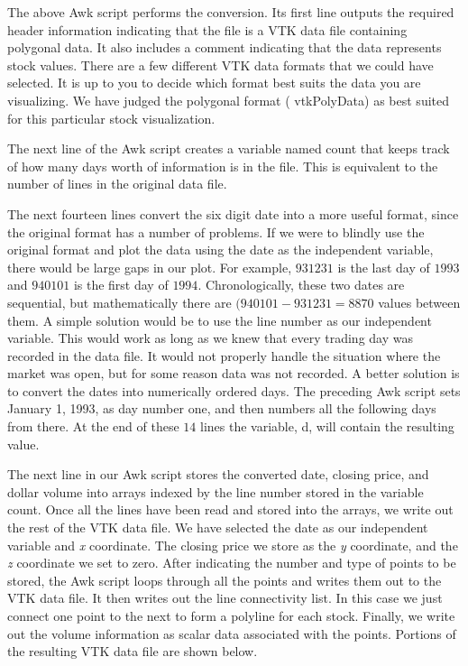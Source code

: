 \noindent The above Awk script performs the conversion. Its first line outputs the required header information indicating that the file is a VTK data file containing polygonal data. It also includes a comment indicating that the data represents stock values. There are a few different VTK data formats that we could have selected. It is up to you to decide which format best suits the data you are visualizing. We have judged the polygonal format ( vtkPolyData) as best suited for this particular stock visualization.

The next line of the Awk script creates a variable named count that keeps track of how many days worth of information is in the file. This is equivalent to the number of lines in the original data file.

The next fourteen lines convert the six digit date into a more useful format, since the original format has a number of problems. If we were to blindly use the original format and plot the data using the date as the independent variable, there would be large gaps in our plot. For example,  $931231$ is the last day of $1993$ and $940101$ is the first day of $1994$. Chronologically, these two dates are sequential, but mathematically there are $(940101 - 931231 = 8870$ values between them. A simple solution would be to use the line number as our independent variable. This would work as long as we knew that every trading day was recorded in the data file. It would not properly handle the situation where the market was open, but for some reason data was not recorded. A better solution is to convert the dates into numerically ordered days. The preceding Awk script sets January 1, 1993, as day number one, and then numbers all the following days from there. At the end of these $14$ lines the variable, d, will contain the resulting value.

The next line in our Awk script stores the converted date, closing price, and dollar volume  into arrays indexed by the line number stored in the variable count. Once all the lines have been read and stored into the arrays, we write out the rest of the VTK data file. We have selected the date as our independent variable and \emph{x} coordinate. The closing price we store as the \emph{y} coordinate, and the \emph{z} coordinate we set to zero. After indicating the number and type of points to be stored, the Awk script loops through all the points and writes them out to the VTK data file. It then writes out the line connectivity list. In this case we just connect one point to the next to form a polyline for each stock. Finally, we write out the volume information as scalar data associated with the points. Portions of the resulting VTK data file are shown below.

